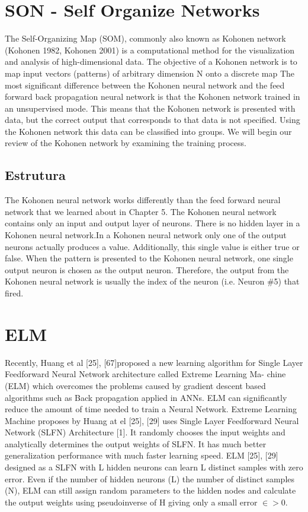 \documentclass[
	article,			%
	11pt,				%
	oneside,			%
	a4paper,			%
	english,			%
	brazil,				%
	sumario=tradicional
	]{abntex2}
\begin{document}
\newpage

\section*{SON - Self Organize Networks} The Self-Organizing Map (SOM), commonly
also known as Kohonen network (Kohonen 1982, Kohonen 2001) is a computational
method for the visualization and analysis of high-dimensional data.
 The
objective of a Kohonen network is to map input vectors (patterns) of arbitrary
dimension N onto a discrete map The most significant difference between the
Kohonen neural network and the feed forward back propagation neural network is
that the Kohonen network trained in an unsupervised mode.
This means that the Kohonen network is presented with data, but the correct
output that corresponds to that data is not specified. Using the Kohonen network
this data can be classified into groups. We will begin our review of the Kohonen
network by examining the training process.
\subsection{Estrutura}
The Kohonen neural network works differently than the feed forward neural
network that we learned about in Chapter 5. The Kohonen neural network contains
only an input and output layer of neurons. There is no hidden layer in a Kohonen
neural network.In a Kohonen neural network only one of the output neurons
actually produces a value. Additionally, this single value is either true or
false. When the pattern is presented to the Kohonen neural network, one single
output neuron is chosen as the output neuron. Therefore, the output from the
Kohonen neural network is usually the index of the neuron (i.e. Neuron \#5) that
fired.

\section*{ELM}
   Recently, Huang et al [25], [67]proposed a new learning algorithm for Single
Layer Feedforward Neural Network architecture called Extreme Learning Ma-
chine (ELM) which overcomes the problems caused by gradient descent based
algorithms such as Back propagation applied in ANNs. ELM can significantly
reduce the amount of time needed to train a Neural Network.
  Extreme Learning Machine proposes by Huang at el [25], [29] uses Single Layer
Feedforward Neural Network (SLFN) Architecture [1]. It randomly chooses the
input weights and analytically determines the output weights of SLFN. It has much
better generalization performance with much faster learning speed.
  ELM [25], [29] designed as a SLFN with L hidden neurons can learn L distinct
samples with zero error. Even if the number of hidden neurons (L) the number
of distinct samples (N), ELM can still assign random parameters to the hidden
nodes and calculate the output weights using pseudoinverse of H giving only a
small error $\in > 0 $.
\end{document}
